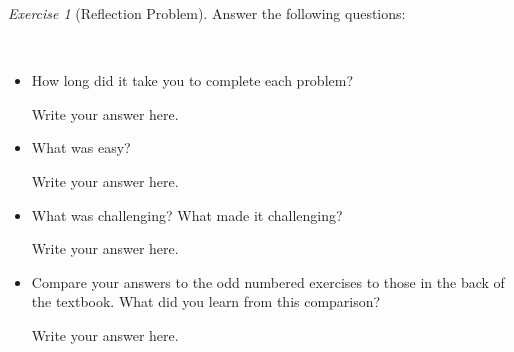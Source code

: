 \documentclass[12pt]{amsart}
\makeatletter
\theoremstyle{remark}
\newtheorem*{exercise}{Exercise}%
\renewenvironment{proof}[1][\proofname]{\par\doublespacing
  \pushQED{\qed}%
  \normalfont \topsep6\p@\@plus6\p@\relax
  \list{}{%
    \settowidth{\leftmargin}{\itshape\proofname:\hskip\labelsep}%
    \setlength{\labelwidth}{0pt}%
    \setlength{\itemindent}{-\leftmargin}%
  }%
  \item[\hskip\labelsep\itshape#1\@addpunct{:}]\ignorespaces
}{%
  \popQED\endlist\@endpefalse
  \singlespacing
}
\theoremstyle{mycomment}
\makeatother
\begin{document}
\begin{exercise}[Reflection Problem]
Answer the following questions:


\begin{proof} \ 


\begin{itemize}
\item How long did it take you to complete each problem? 

Write your answer here.
\item What was easy?

Write your answer here.
\item What was challenging? What made it challenging?

Write your answer here.
\item Compare your answers to the odd numbered exercises to those in the back of the textbook. What did you learn from this comparison?

Write your answer here.
\end{itemize}\end{proof}
\end{exercise}









 
\end{document}
